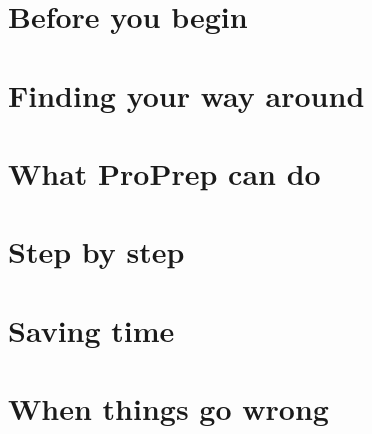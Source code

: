 \documentclass[11pt,openany]{book}
\begin{document}
\frontmatter

\tableofcontents



\mainmatter
\part{Before you begin}




\part{Finding your way around}




\part{What ProPrep can do}


\part{Step by step}














\part{Saving time}




\part{When things go wrong}




\appendix






\backmatter
\printindex
\end{document}
